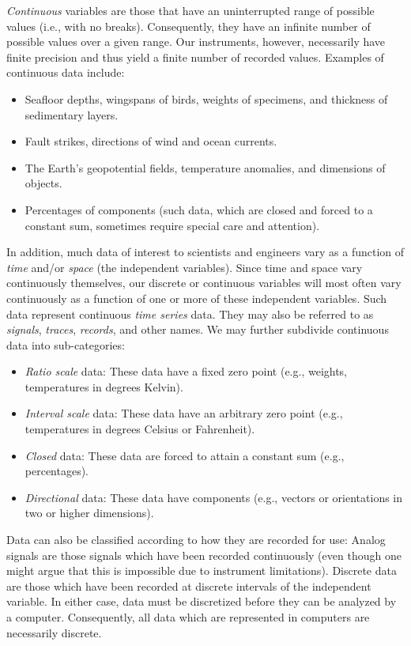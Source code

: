 	\emph{Continuous} variables are those that have an uninterrupted range of possible values (i.e., with 
no breaks).
Consequently, they have an infinite number of possible values over a given range.  Our instruments, however,
necessarily have finite precision and thus yield a finite number of recorded values.  Examples 
of continuous data include:

\begin{itemize}
\item	Seafloor depths, wingspans of birds, weights of specimens, and thickness of sedimentary layers.
\item	Fault strikes, directions of wind and ocean currents.
\item	The Earth's geopotential fields, temperature anomalies, and dimensions of objects.
\item 	Percentages of components (such data, which are closed and forced to a constant sum, sometimes 
require special care and attention).
\end{itemize}

	In addition, much data of interest to scientists and engineers vary as a function of \emph{time} and/or \emph{space} 
(the independent variables).  Since time and space vary continuously themselves, our discrete or 
continuous variables will most often vary continuously as a function of one or more of these independent 
variables.  Such data represent continuous \emph{time series} data.  They may also be referred to as 
\emph{signals}, \emph{traces}, \emph{records}, and other names.  We may further subdivide continuous data into sub-categories:
\begin{itemize}
\item	\emph{Ratio scale} data: These data have a fixed zero point (e.g., weights, temperatures in degrees Kelvin).
\item	\emph{Interval scale} data: These data have an arbitrary zero point (e.g., temperatures in degrees Celsius or
Fahrenheit).
\item	\emph{Closed} data: These data are forced to attain a constant sum (e.g., percentages).
\item \emph{Directional} data: These data have components (e.g., vectors or orientations in two or higher dimensions).
\end{itemize}

	Data can also be classified according to how they are recorded for use:  
Analog signals are those signals which have been recorded continuously (even though one might 
argue that this is impossible due to instrument limitations).  Discrete data are those which have been
recorded at discrete intervals of the independent variable.
In either case, data must be discretized before they can be analyzed by a computer.  Consequently, all
data which are represented in computers are necessarily discrete.

